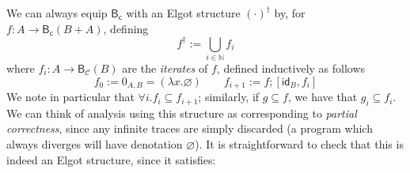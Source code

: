 \documentclass[acmsmall,screen,review]{acmart}
\newcommand{\mc}[1]{\ensuremath{\mathcal{#1}}}
\newcommand{\ms}[1]{\ensuremath{\mathsf{#1}}}
\newcommand{\nats}{\mathbb{N}}
\begin{document}
We can always equip $\ms{B}_{\ms{c}}$ with an Elgot structure $(\cdot)^\dagger$ by, for $f: A \to
\ms{B}_{\ms{c}}(B + A)$, defining
\begin{equation*}
  f^\dagger := \bigcup_{i \in \nats}f_i
\end{equation*}
where $f_i : A \to \ms{B}_{\mc{C}}(B)$ are the \emph{iterates} of $f$, defined inductively as
follows
\begin{equation*}
  f_0 := 0_{A, B} = (\lambda x . \varnothing) \qquad
  f_{i + 1} := f ; [\ms{id}_B, f_{i}]
\end{equation*}
We note in particular that $\forall i . f_i \subseteq f_{i + 1}$; similarly, if $g \subseteq f$, we
have that $g_i \subseteq f_i$. We can think of analysis using this structure as corresponding to
\emph{partial correctness}, since any infinite traces are simply discarded (a program which always
diverges will have denotation $\varnothing$). It is straightforward to check that this is indeed an
Elgot structure, since it satisfies:
\end{document}
